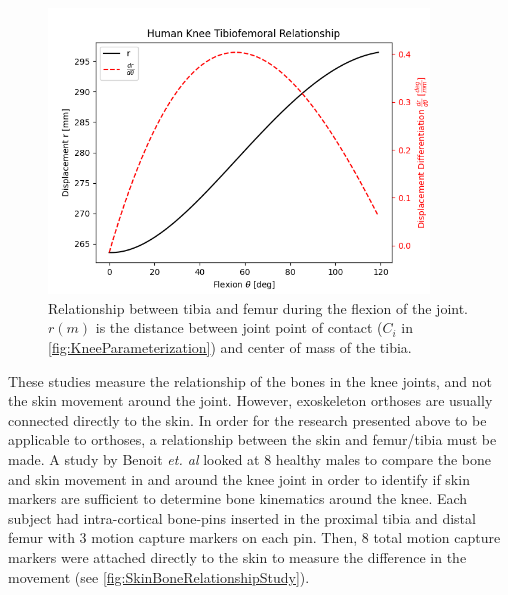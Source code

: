 \begin{figure}[ht!]
    \centering
    \includegraphics[width=0.9\textwidth]{Figures/Background/FlexionCurve.png}
    \caption{Relationship between tibia and femur during the flexion of the joint. \(r(m)\) is the distance between joint point of contact (\(C_i\) in \autoref{fig:KneeParameterization}) and center of mass of the tibia.}
    \label{fig:KneeFlexionCurve}
\end{figure}

These studies measure the relationship of the bones in the knee joints, and not the skin movement around the joint. However, exoskeleton orthoses are usually connected directly to the skin. In order for the research presented above to be applicable to orthoses, a relationship between the skin and femur/tibia must be made. A study by Benoit \textit{et. al} looked at 8 healthy males to compare the bone and skin movement in and around the knee joint in order to identify if skin markers are sufficient to determine bone kinematics around the knee. Each subject had intra-cortical bone-pins inserted in the proximal tibia and distal femur with 3 motion capture markers on each pin. Then, 8 total motion capture markers were attached directly to the skin to measure the difference in the movement (see \autoref{fig:SkinBoneRelationshipStudy}). 

